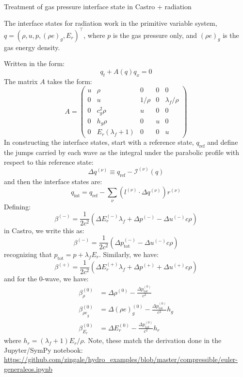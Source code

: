 \documentclass[12pt]{article}
\newcommand{\nup}{{(\nu)}}
\newcommand{\evm}{{(-)}}
\newcommand{\evz}{{(0)}}
\newcommand{\evp}{{(+)}}
\begin{document}
\begin{center}
{\Large Treatment of gas pressure interface state in Castro + radiation}
\end{center}

The interface states for radiation work in the primitive variable
system, $q = (\rho, u, p, (\rho e)_g, E_r)^\intercal$, where $p$ is
the gas pressure only, and $(\rho e)_g$ is the gas energy density.

Written in the form:
\begin{equation}
q_t + A(q) q_x = 0
\end{equation}
The matrix $A$ takes the form:
\begin{equation}
A = \left (
\begin{matrix}
u & \rho & 0 & 0 & 0\\
0 & u & {1}/{\rho} & 0 & \lambda_f/{\rho}\\
0 & c_{g}^{2} \rho & u & 0 & 0\\
0 & h_{g} \rho & 0 & u & 0\\
0 & E_{r} \left(\lambda_f + 1\right) & 0 & 0 & u
\end{matrix}\right )
\end{equation}
In constructing the interface states, start with a reference state,
$q_\mathrm{ref}$ and define the jumps carried by each wave as the
integral under the parabolic profile with respect to this reference
state:
\begin{equation}
\Delta q^\nup \equiv q_\mathrm{ref} - \mathcal{I}^\nup(q)
\end{equation}
and then the interface states are:
\begin{equation}
q_\mathrm{int} = q_\mathrm{ref} - \sum_\nu (l^\nup \cdot \Delta q^\nup) r^\nup
\end{equation}
Defining:
\begin{equation}
\beta^\evm = \frac{1}{2 c^{2}} \left(
    \Delta E_r^\evm \lambda_f + \Delta p^\evm - \Delta u^\evm c \rho\right)
\end{equation}
in Castro, we write this as:
\begin{equation}
\beta^\evm = \frac{1}{2 c^{2}} \left(
    \Delta p_\mathrm{tot}^\evm - \Delta u^\evm c \rho\right)
\end{equation}
recognizing that $p_\mathrm{tot} = p + \lambda_f E_r$.
Similarly, we have:
\begin{equation}
\beta^\evp = \frac{1}{2 c^{2}} \left(
    \Delta E_r^\evp \lambda_f + \Delta p^\evp + \Delta u^\evp c \rho\right)
\end{equation}
and for the 0-wave, we have:
\begin{align}
\beta^\evz_\rho &= 
    \Delta\rho^\evz  - \frac{\Delta p^\evz_\mathrm{tot}}{c^2} \\
%
\beta^\evz_{{\rho e}_g} &= \Delta(\rho e)^\evz_g - \frac{\Delta p_\mathrm{tot}^\evz}{c^2} h_g \\
%
\beta^\evz_{E_r} &= \Delta E_r^\evz - \frac{\Delta p_\mathrm{tot}^\evz}{c^2} h_r
\end{align}
where $h_r = (\lambda_f + 1)E_r/\rho$.  Note, these match the derivation
done in the Jupyter/SymPy notebook:\newline
{\footnotesize \url{https://github.com/zingale/hydro_examples/blob/master/compressible/euler-generaleos.ipynb}}
\end{document}
